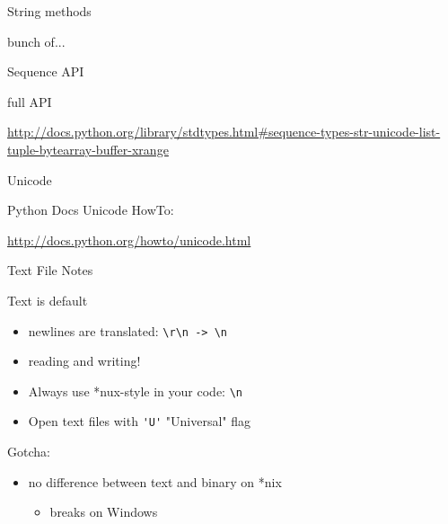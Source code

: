 \documentclass{beamer}
\begin{document}
\begin{frame}{String methods}

  {\Large bunch of...}

\end{frame}

\begin{frame}[fragile]{Sequence API}

  {\Large full API}

\url{http://docs.python.org/library/stdtypes.html#sequence-types-str-unicode-list-tuple-bytearray-buffer-xrange}

\end{frame}

\begin{frame}[fragile]{Unicode}

{\Large Python Docs Unicode HowTo:}

\url{http://docs.python.org/howto/unicode.html}

\end{frame}


\begin{frame}[fragile]{Text File Notes}

{\Large Text is default}
\begin{itemize}
  \item newlines are translated: \verb|\r\n -> \n|
  \item reading and writing!
  \item Always use *nux-style in your code: \verb|\n|
  \item Open text files with \verb|'U'| "Universal" flag
\end{itemize}

\vfill
{\Large Gotcha:}
\begin{itemize}
  \item  no difference between text and binary on *nix\\
  \begin{itemize}
    \item breaks on Windows
  \end{itemize}
\end{itemize}

\end{frame}
\end{document}
